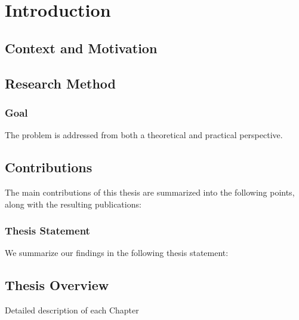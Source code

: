 \chapter{Introduction}
\label{chap:introduction}

\section{Context and Motivation}




\section{Research Method}
\subsection*{Goal}


The problem is addressed from both a theoretical and practical perspective.


\section{Contributions}
The main contributions of this thesis are summarized into the following points, along with the resulting publications:


\subsection*{Thesis Statement}
We summarize our findings in the following thesis statement:


\vspace{2mm}

\section{Thesis Overview}
Detailed description of each Chapter
